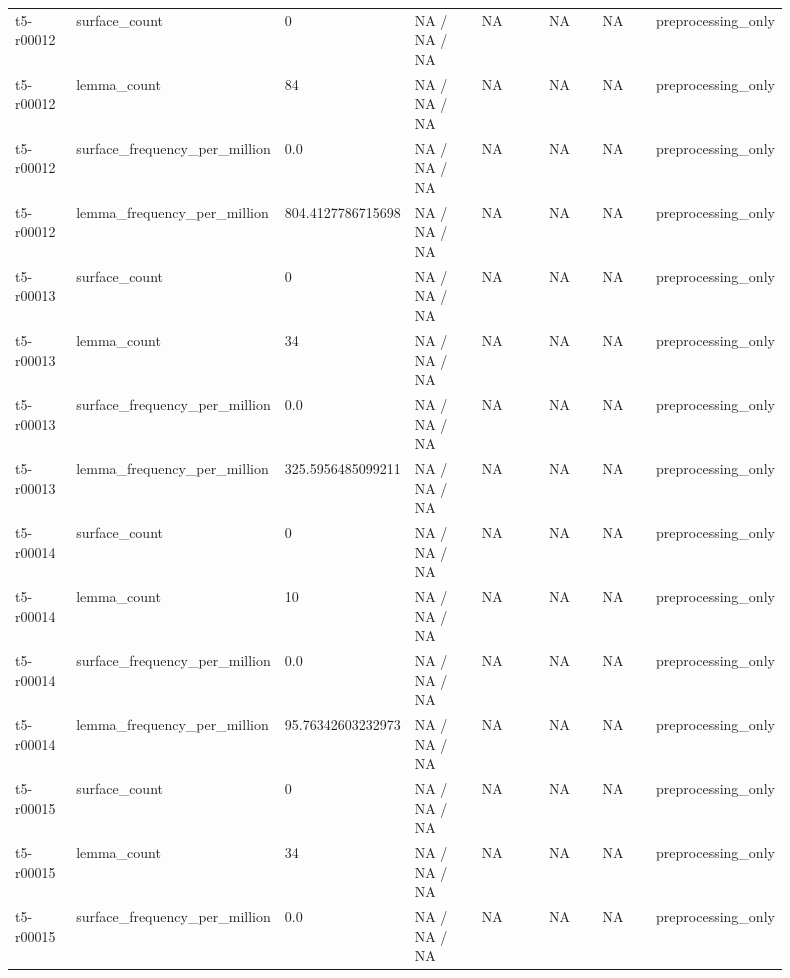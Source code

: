 \begin{longtable}{@{}p{0.09\linewidth}p{0.14\linewidth}p{0.08\linewidth}p{0.14\linewidth}p{0.14\linewidth}p{0.1\linewidth}p{0.1\linewidth}p{0.11\linewidth}@{}}
t5-r00012 & surface\_\allowbreak{}count & 0 & NA / NA / NA & NA & NA & NA & preprocessing\_\allowbreak{}only \\
t5-r00012 & lemma\_\allowbreak{}count & 84 & NA / NA / NA & NA & NA & NA & preprocessing\_\allowbreak{}only \\
t5-r00012 & surface\_\allowbreak{}frequency\_\allowbreak{}per\_\allowbreak{}million & 0.0 & NA / NA / NA & NA & NA & NA & preprocessing\_\allowbreak{}only \\
t5-r00012 & lemma\_\allowbreak{}frequency\_\allowbreak{}per\_\allowbreak{}million & 804.4127786715698 & NA / NA / NA & NA & NA & NA & preprocessing\_\allowbreak{}only \\
t5-r00013 & surface\_\allowbreak{}count & 0 & NA / NA / NA & NA & NA & NA & preprocessing\_\allowbreak{}only \\
t5-r00013 & lemma\_\allowbreak{}count & 34 & NA / NA / NA & NA & NA & NA & preprocessing\_\allowbreak{}only \\
t5-r00013 & surface\_\allowbreak{}frequency\_\allowbreak{}per\_\allowbreak{}million & 0.0 & NA / NA / NA & NA & NA & NA & preprocessing\_\allowbreak{}only \\
t5-r00013 & lemma\_\allowbreak{}frequency\_\allowbreak{}per\_\allowbreak{}million & 325.5956485099211 & NA / NA / NA & NA & NA & NA & preprocessing\_\allowbreak{}only \\
t5-r00014 & surface\_\allowbreak{}count & 0 & NA / NA / NA & NA & NA & NA & preprocessing\_\allowbreak{}only \\
t5-r00014 & lemma\_\allowbreak{}count & 10 & NA / NA / NA & NA & NA & NA & preprocessing\_\allowbreak{}only \\
t5-r00014 & surface\_\allowbreak{}frequency\_\allowbreak{}per\_\allowbreak{}million & 0.0 & NA / NA / NA & NA & NA & NA & preprocessing\_\allowbreak{}only \\
t5-r00014 & lemma\_\allowbreak{}frequency\_\allowbreak{}per\_\allowbreak{}million & 95.76342603232973 & NA / NA / NA & NA & NA & NA & preprocessing\_\allowbreak{}only \\
t5-r00015 & surface\_\allowbreak{}count & 0 & NA / NA / NA & NA & NA & NA & preprocessing\_\allowbreak{}only \\
t5-r00015 & lemma\_\allowbreak{}count & 34 & NA / NA / NA & NA & NA & NA & preprocessing\_\allowbreak{}only \\
t5-r00015 & surface\_\allowbreak{}frequency\_\allowbreak{}per\_\allowbreak{}million & 0.0 & NA / NA / NA & NA & NA & NA & preprocessing\_\allowbreak{}only \\

\end{longtable}
